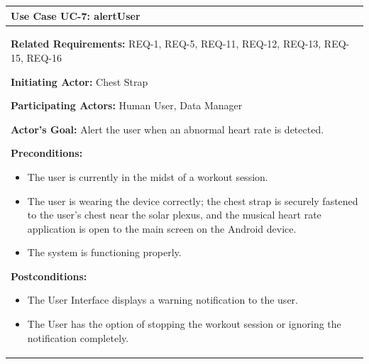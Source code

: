 \documentclass[letterpaper,english, 12pt]{scrreprt}
\begin{document}
\begin{center}
        \begin{longtable}{|C{15cm}|}
                \hline
                        \textbf{Use Case UC-7: alertUser}\\
                
			\hline
	\nopagebreak
                        \begin{flushleft}
                                \textbf{Related Requirements: } REQ-1, REQ-5, REQ-11, REQ-12, REQ-13, REQ-15, REQ-16
                        \end{flushleft}
                        \begin{flushleft}
                                \textbf{Initiating Actor: } Chest Strap
                        \end{flushleft}
                        \begin{flushleft}
                                \textbf{Participating Actors: } Human User, Data Manager
                        \end{flushleft}
                        \begin{flushleft}
                                \textbf{Actor's Goal: } Alert the user when an abnormal heart rate is detected.
                        \end{flushleft}
                        \begin{flushleft}
                                \textbf{Preconditions: }
                        \end{flushleft}
                                \begin{itemize}
                                        \item The user is currently in the midst of a workout session.
                                        \item The user is wearing the device correctly; the chest strap is securely fastened to the user's chest near the solar plexus, and the musical heart rate application is open to the main screen on the Android device.
										\item The system is functioning properly.
								\end{itemize}
                        \begin{flushleft}
                                \textbf{Postconditions: }
                        \end{flushleft}
                                \begin{itemize}
                                        \item The User Interface displays a warning notification to the user.
                                        \item The User has the option of stopping the workout session or ignoring the notification completely.
                                \end{itemize}\\
                                \hline
        \end{longtable}
\end{center}
\end{document}
